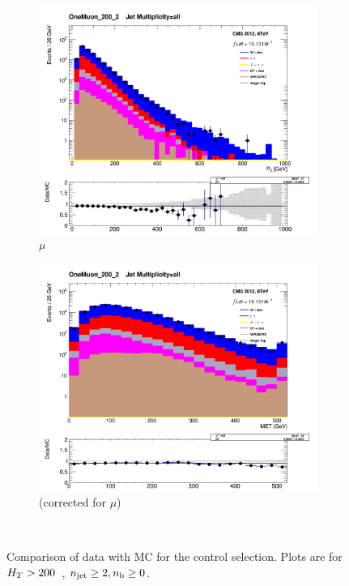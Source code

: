 \begin{figure}[!ht]
  \centering
    \begin{subfigure}[b]{0.48\textwidth}
      \includegraphics[width=\textwidth]{Figs/datamc/mu/Stacked_MuPt_all_OneMuon_200_upwards}
      \caption{$\mu$ \Pt}
    \end{subfigure}
    \begin{subfigure}[b]{0.48\textwidth}
      \includegraphics[width=\textwidth]{Figs/datamc/mu/Stacked_MET_Corrected_all_OneMuon_200_upwards}
      \caption{\met (corrected for $\mu$)}
    \end{subfigure} \\
    \caption{\label{fig:datamc_mu_inc}
    Comparison of data with MC for the \mj control selection. Plots 
    are for $H_T>200$~\gev, $n_{\text{jet}}\geq2, n_{\text{b}}\geq0$.
    }
\end{figure}


